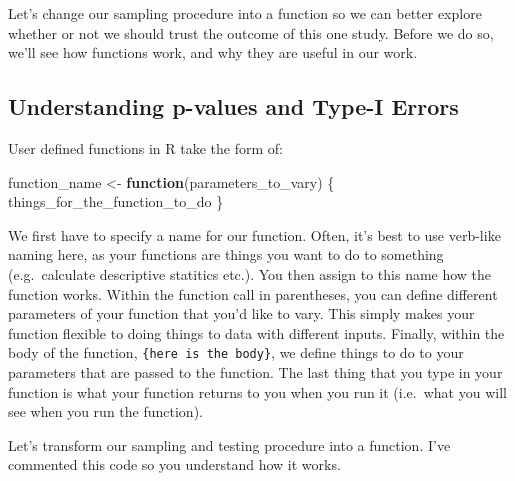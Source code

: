 \documentclass[
]{book}
\newenvironment{Shaded}{\begin{snugshade}}{\end{snugshade}}
\newcommand{\ControlFlowTok}[1]{\textcolor[rgb]{0.13,0.29,0.53}{\textbf{#1}}}
\newcommand{\NormalTok}[1]{#1}
\newcommand{\OtherTok}[1]{\textcolor[rgb]{0.56,0.35,0.01}{#1}}
\begin{document}
Let's change our sampling procedure into a function so we can better explore whether or not we should trust the outcome of this one study. Before we do so, we'll see how functions work, and why they are useful in our work.

\hypertarget{understanding-p-values-and-type-i-errors}{%
\subsection{Understanding p-values and Type-I Errors}\label{understanding-p-values-and-type-i-errors}}

User defined functions in R take the form of:

\begin{Shaded}
\begin{Highlighting}[]
\NormalTok{function\_name }\OtherTok{\textless{}{-}} \ControlFlowTok{function}\NormalTok{(parameters\_to\_vary) \{}
\NormalTok{  things\_for\_the\_function\_to\_do}
\NormalTok{\}}
\end{Highlighting}
\end{Shaded}

We first have to specify a name for our function. Often, it's best to use verb-like naming here, as your functions are things you want to do to something (e.g.~calculate descriptive statitics etc.). You then assign to this name how the function works. Within the function call in parentheses, you can define different parameters of your function that you'd like to vary. This simply makes your function flexible to doing things to data with different inputs. Finally, within the body of the function, \texttt{\{here\ is\ the\ body\}}, we define things to do to your parameters that are passed to the function. The last thing that you type in your function is what your function returns to you when you run it (i.e.~what you will see when you run the function).

Let's transform our sampling and testing procedure into a function. I've commented this code so you understand how it works.
\end{document}
